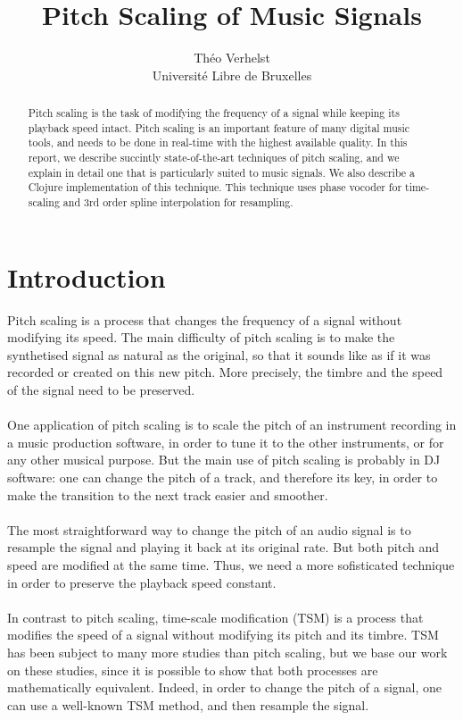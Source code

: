 \documentclass[letterpaper]{article}
\title{Pitch Scaling of Music Signals}
\author{Théo Verhelst \\
Université Libre de Bruxelles}
\begin{document}
\maketitle

\begin{abstract}
Pitch scaling is the task of modifying the frequency of a signal while keeping
its playback speed intact. Pitch scaling is an important feature of many digital
music tools, and needs to be done in real-time with the highest available
quality. In this report, we describe succintly state-of-the-art techniques of
pitch scaling, and we explain in detail one that is particularly suited to music
signals. We also describe a Clojure implementation of this technique. This
technique uses phase vocoder for time-scaling and 3rd order spline interpolation
for resampling.
\end{abstract}

\section{Introduction}
Pitch scaling is a process that changes the frequency of a signal without
modifying its speed. The main difficulty of pitch scaling is to make the
synthetised signal as natural as the original, so that it sounds like as if it
was recorded or created on this new pitch. More precisely, the timbre and the
speed of the signal need to be preserved.
\paragraph{}
One application of pitch scaling is to scale the pitch of an instrument
recording in a music production software, in order to tune it to the other
instruments, or for any other musical purpose. But the main use of pitch scaling
is probably in DJ software: one can change the pitch of a track, and therefore
its key, in order to make the transition to the next track easier and smoother.
\paragraph{}
The most straightforward way to change the pitch of an audio signal is to
resample the signal and playing it back at its original rate. But both pitch and
speed are modified at the same time. Thus, we need a more sofisticated
technique in order to preserve the playback speed constant.
\paragraph{}
In contrast to pitch scaling, time-scale modification (TSM) is a process that
modifies the speed of a signal without modifying its pitch and its timbre.
TSM has been subject to many more studies than pitch scaling, but we base our
work on these studies, since it is possible to show that both processes are
mathematically equivalent. Indeed, in order to change the pitch of a signal, one
can use a well-known TSM method, and then resample the signal.
\end{document}
